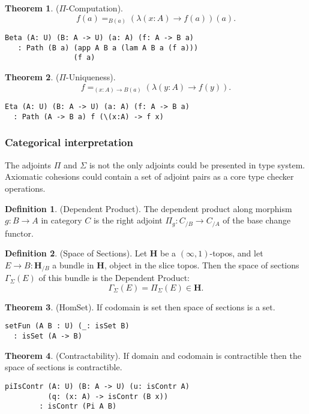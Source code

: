 \documentclass{article}
\theoremstyle{definition}
\newtheorem{theorem}{Theorem}
\newtheorem{definition}{Definition}
\begin{document}
\begin{theorem} ($\Pi$-Computation).
$$f(a) =_{B(a)} (\lambda (x:A) \rightarrow f(a))(a).$$
\begin{lstlisting}
Beta (A: U) (B: A -> U) (a: A) (f: A -> B a)
   : Path (B a) (app A B a (lam A B a (f a)))
                (f a)
\end{lstlisting}
\end{theorem}

\begin{theorem} ($\Pi$-Uniqueness).
$$f =_{(x:A)\rightarrow B(a)} (\lambda (y:A) \rightarrow f(y)).$$
\begin{lstlisting}
Eta (A: U) (B: A -> U) (a: A) (f: A -> B a)
  : Path (A -> B a) f (\(x:A) -> f x)
\end{lstlisting}
\end{theorem}

\subsubsection*{Categorical interpretation}

The adjoints $\Pi$ and $\Sigma$ is not the only adjoints could be presented in type system.
Axiomatic cohesions could contain a set of adjoint pairs as a core type checker operations.

\begin{definition} (Dependent Product).
The dependent product along morphism $g: B \rightarrow A$ in category $C$ is the right
adjoint $\Pi_g : C_{/B} \rightarrow C_{/A}$ of the base change functor.
\end{definition}

\begin{definition} (Space of Sections).
Let $\mathbf{H}$ be a $(\infty,1)$-topos, and let $E \rightarrow B : \mathbf{H}_{/B}$ a bundle in
$\mathbf{H}$, object in the slice topos. Then the space of sections $\Gamma_\Sigma(E)$
of this bundle is the Dependent Product:
$$ \Gamma_\Sigma(E) = \Pi_\Sigma (E) \in \mathbf{H}. $$
\end{definition}

\begin{theorem} (HomSet).
If codomain is set then space of sections is a set.
\begin{lstlisting}
setFun (A B : U) (_: isSet B)
  : isSet (A -> B)
\end{lstlisting}
\end{theorem}

\begin{theorem} (Contractability).
If domain and codomain is contractible then the space of sections is contractible.
\begin{lstlisting}
piIsContr (A: U) (B: A -> U) (u: isContr A)
          (q: (x: A) -> isContr (B x))
        : isContr (Pi A B)
\end{lstlisting}
\end{theorem}
\end{document}
